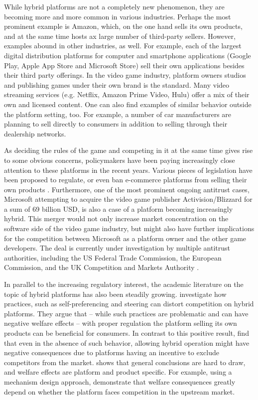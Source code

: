 \documentclass[a4paper]{article}
\begin{document}
While hybrid platforms are not a completely new phenomenon, they are becoming more and more common in various industries.
Perhaps the most prominent example is Amazon, which, on the one hand sells its own products, and at the same time hosts ax large number of third-party sellers.
However, examples abound in other industries, as well.
For example, each of the largest digital distribution platforms for computer and smartphone applications (Google Play, Apple App Store and Microsoft Store) sell their own applications besides their third party offerings.
In the video game industry, platform owners studios and publishing games under their own brand is the standard.
Many video streaming services (e.g. Netflix, Amazon Prime Video, Hulu) offer a mix of their own and licensed content.
One can also find examples of similar behavior outside the platform setting, too.
For example, a number of car manufacturers are planning to sell directly to consumers in addition to selling through their dealership networks.

As deciding the rules of the game and competing in it at the same time gives rise to some obvious concerns, policymakers have been paying increasingly close attention to these platforms in the recent years.
Various pieces of legislation have been proposed to regulate, or even ban e-commerce platforms from selling their own products \parencite[][]{phartiyal_2019,reynolds_2022,eu-2022}.
Furthermore, one of the most prominent ongoing antitrust cases, Microsoft attempting to acquire the video game publisher Activision/Blizzard for a sum of 69 billion USD, is also a case of a platform becoming increasingly hybrid.
This merger would not only increase market concentration on the software side of the video game industry, but might also have further implications for the competition between Microsoft as a platform owner and the other game developers.
The deal is currently under investigation by multiple antitrust authorities, including the US Federal Trade Commission, the European Commission, and the UK Competition and Markets Authority \parencite{livni_merced_2023}.

In parallel to the increasing regulatory interest, the academic literature on the topic of hybrid platforms has also been steadily growing.
\textcite{hagiu2022should} investigate how practices, such as self-preferencing and steering can distort competition on hybrid platforms.
They argue that -- while such practices are problematic and can have negative welfare effects -- with proper regulation the platform selling its own products can be beneficial for consumers.
In contrast to this positive result, \textcite[]{anderson2021hybrid} find that even in the absence of such behavior, allowing hybrid operation might have negative consequences due to platforms having an incentive to exclude competitors from the market.
\textcite[]{gutierrez2021welfare} shows that general conclusions are hard to draw, and welfare effects are platform and product specific.
For example, using a mechanism design approach, \textcite{kang2022contracting} demonstrate that welfare consequences greatly depend on whether the platform faces competition in the upstream market.
\end{document}
